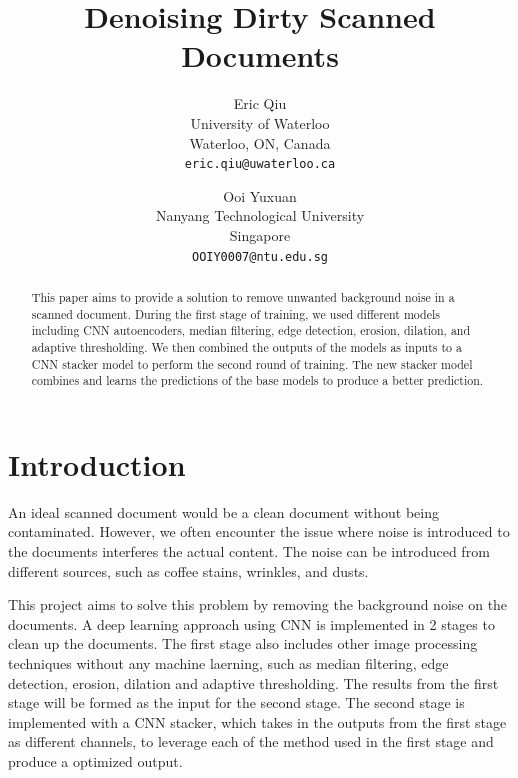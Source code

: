 \documentclass[10pt,twocolumn,letterpaper]{article}
\begin{document}
\title{Denoising Dirty Scanned Documents}

\author{Eric Qiu\\
University of Waterloo\\
Waterloo, ON, Canada\\
{\tt\small eric.qiu@uwaterloo.ca}
\and
Ooi Yuxuan\\
Nanyang Technological University\\
Singapore\\
{\tt\small OOIY0007@ntu.edu.sg}
}

\maketitle

\begin{abstract}
   This paper aims to provide a solution to remove unwanted background noise in a scanned document. During the first stage of training, we used different models including CNN autoencoders, median filtering, edge detection, erosion, dilation, and adaptive thresholding. We then combined the outputs of the models as inputs to a CNN stacker model to perform the second round of training. The new stacker model combines and learns the predictions of the base models to produce a better prediction.
\end{abstract}

\section{Introduction}

    An ideal scanned document would be a clean document without being contaminated. However, we often encounter the issue where noise is introduced to the documents interferes the actual content. The noise can be introduced from different sources, such as coffee stains, wrinkles, and dusts.

    This project aims to solve this problem by removing the background noise on the documents. A deep learning approach using CNN is implemented in 2 stages to clean up the documents. The first stage also includes other image processing techniques without any machine laerning, such as median filtering, edge detection, erosion, dilation and adaptive thresholding. The results from the first stage will be formed as the input for the second stage. The second stage is implemented with a CNN stacker, which takes in the outputs from the first stage as different channels, to leverage each of the method used in the first stage and produce a optimized output.
\end{document}
